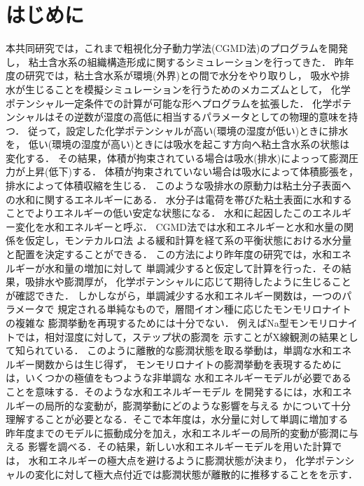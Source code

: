 \section{はじめに}
\hspace{\parindent}
本共同研究では，これまで粗視化分子動力学法(CGMD法)のプログラムを開発し，
粘土含水系の組織構造形成に関するシミュレーションを行ってきた．
昨年度の研究では，粘土含水系が環境(外界)との間で水分をやり取りし，
吸水や排水が生じることを模擬シミュレーションを行うためのメカニズムとして，
化学ポテンシャル一定条件での計算が可能な形へプログラムを拡張した．
化学ポテンシャルはその逆数が湿度の高低に相当するパラメータとしての物理的意味を持つ．
従って，設定した化学ポテンシャルが高い(環境の湿度が低い)ときに排水を，
低い(環境の湿度が高い)ときには吸水を起こす方向へ粘土含水系の状態は変化する．
その結果，体積が拘束されている場合は吸水(排水)によっって膨潤圧力が上昇(低下)する．
体積が拘束されていない場合は吸水によって体積膨張を，排水によって体積収縮を生じる．
%
このような吸排水の原動力は粘土分子表面への水和に関するエネルギーにある．
水分子は電荷を帯びた粘土表面に水和することでよりエネルギーの低い安定な状態になる．
水和に起因したこのエネルギー変化を水和エネルギーと呼ぶ．
CGMD法では水和エネルギーと水和水量の関係を仮定し，モンテカルロ法
よる緩和計算を経て系の平衡状態における水分量と配置を決定することができる．
%
この方法により昨年度の研究では，水和エネルギーが水和量の増加に対して
単調減少すると仮定して計算を行った．その結果，吸排水や膨潤厚が，
化学ポテンシャルに応じて期待したように生じることが確認できた．
しかしながら，単調減少する水和エネルギー関数は，一つのパラメータで
規定される単純なもので，層間イオン種に応じたモンモリロナイトの複雑な
膨潤挙動を再現するためには十分でない．
例えばNa型モンモリロナイトでは，相対湿度に対して，ステップ状の膨潤を
示すことがX線観測の結果として知られている．
このように離散的な膨潤状態を取る挙動は，単調な水和エネルギー関数からは生じ得ず，
モンモリロナイトの膨潤挙動を表現するためには，いくつかの極値をもつような非単調な
水和エネルギーモデルが必要であることを意味する．そのような水和エネルギーモデル
を開発するには，水和エネルギーの局所的な変動が，膨潤挙動にどのような影響を与える
かについて十分理解することが必要となる．そこで本年度は，水分量に対して単調に増加する
昨年度までのモデルに振動成分を加え，水和エネルギーの局所的変動が膨潤に与える
影響を調べる．その結果，新しい水和エネルギーモデルを用いた計算では，
水和エネルギーの極大点を避けるように膨潤状態が決まり，
化学ポテンシャルの変化に対して極大点付近では膨潤状態が離散的に推移することをを示す．


